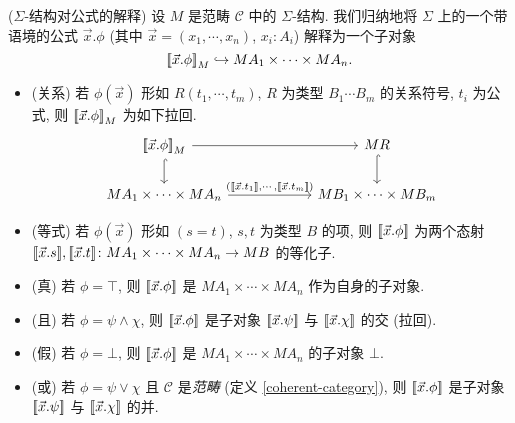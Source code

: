 \begin{definition}
	[label={interpretation-formolae}]
	{($\Sigma$-结构对公式的解释)}
	设 $M$ 是范畴 $\mathcal C$ 中的 $\Sigma$-结构.
	我们归纳地将 $\Sigma$ 上的一个带语境的公式 $\vec x.\phi$ (其中 $\vec x= (x_1,\cdots,x_n)$, $x_i\colon A_i$) 解释为一个子对象
	$$
	{[\![\vec x.\phi]\!]}_M \hookrightarrow MA_1 \times \cdots \times MA_n.
	$$
	\begin{itemize}
		\item (关系) 若 $\phi(\vec x)$ 形如 $R(t_1,\cdots,t_m)$, $R$ 为类型 $B_1\cdots B_m$ 的关系符号, $t_i$ 为公式, 则
		${[\![\vec x.\phi]\!]}_M$ 为如下拉回.
		\[\begin{tikzcd}[ampersand replacement=\&,column sep=6em]
			{\interpretation{\vec x.\phi}_M} \& MR \\
			{MA_1\times\cdots\times MA_n} \& {MB_1\times\cdots\times MB_m}
			\arrow["{(\interpretation{\vec x.t_1},\cdots,\interpretation{\vec x.t_m})}", from=2-1, to=2-2]
			\arrow[hook, from=1-1, to=2-1]
			\arrow[from=1-1, to=1-2]
			\arrow[hook, from=1-2, to=2-2]
		\end{tikzcd}\]
		\item (等式) 若 $\phi(\vec x)$ 形如 $(s=t)$, $s,t$ 为类型 $B$ 的项, 则 ${[\![\vec x.\phi]\!]}$ 为两个态射 ${[\![\vec x.s]\!]},{[\![\vec x.t]\!]}\colon MA_1\times\cdots\times MA_n \to MB$ 的等化子.
		\item (真) 若 $\phi = \top$, 则 ${[\![\vec x.\phi]\!]}$ 是 $MA_1\times\cdots\times MA_n$ 作为自身的子对象.
		\item (且) 若 $\phi = \psi \wedge \chi$, 则 ${[\![\vec x.\phi]\!]}$ 是子对象 ${[\![\vec x.\psi]\!]}$ 与 ${[\![\vec x.\chi]\!]}$ 的交 (拉回).
		\item (假) 若 $\phi = \bot$, 则 ${[\![\vec x.\phi]\!]}$ 是 $MA_1\times\cdots\times MA_n$ 的子对象 $\bot$.
		\item (或) 若 $\phi = \psi \lor \chi$ 且 $\mathcal C$ 是\emph{\coherent{}范畴} (定义 \ref{coherent-category}),
		则 ${[\![\vec x.\phi]\!]}$ 是子对象 ${[\![\vec x.\psi]\!]}$ 与 ${[\![\vec x.\chi]\!]}$ 的并.

\end{itemize}
\end{definition}
